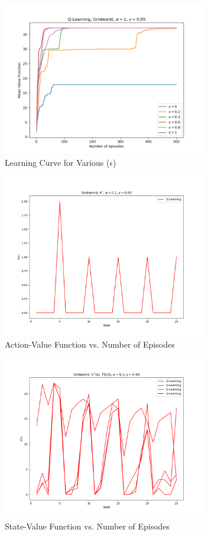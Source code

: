 \documentclass[conference]{IEEEtran}
\begin{document}
\begin{figure}[!htbp]
\centerline{\includegraphics[width=3.5in]{g_ql_learning_curves_epsilon}}
\caption{Learning Curve for Various ($\epsilon$)}
\label{fig}
\end{figure}
\FloatBarrier

\begin{figure}[!htbp]
\centerline{\includegraphics[width=3.5in]{g_ql_policy}}
\caption{Action-Value Function vs. Number of Episodes}
\label{fig}
\end{figure}
\FloatBarrier

\begin{figure}[!htbp]
\centerline{\includegraphics[width=3.5in]{g_ql_state_value}}
\caption{State-Value Function vs. Number of Episodes}
\label{fig}
\end{figure}
\FloatBarrier
\end{document}
